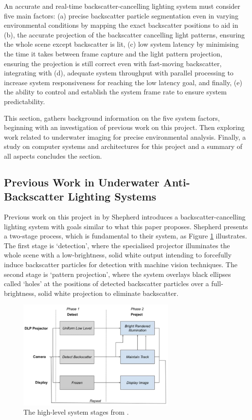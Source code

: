 An accurate and real-time backscatter-cancelling lighting system must consider five main factors: (a) precise backscatter particle segmentation even in varying environmental conditions by mapping the exact backscatter positions to aid in (b), the accurate projection of the backscatter cancelling light patterns, ensuring the whole scene except backscatter is lit, (c) low system latency by minimising the time it takes between frame capture and the light pattern projection, ensuring the projection is still correct even with fast-moving backscatter, integrating with (d), adequate system throughput with parallel processing to increase system responsiveness for reaching the low latency goal, and finally, (e) the ability to control and establish the system frame rate to ensure system predictability.

This section, gathers background information on the five system factors, beginning with an investigation of previous work on this project. Then exploring work related to underwater imaging for precise environmental analysis. Finally, a study on computer systems and architectures for this project and a summary of all aspects concludes the section.

\subsection{Previous Work in Underwater Anti-Backscatter Lighting Systems}
\label{prevwork}

Previous work on this project in \cite{katieshepherdMachineVisionBased2023} by Shepherd introduces a backscatter-cancelling lighting system with goals similar to what this paper proposes. Shepherd presents a two-stage process, which is fundamental to their system, as Figure \ref{fig:shepherd_system_stages} illustrates. The first stage is `detection', where the specialised projector illuminates the whole scene with a low-brightness, solid white output intending to forcefully induce backscatter particles for detection with machine vision techniques. The second stage is `pattern projection', where the system overlays black ellipses called `holes' at the positions of detected backscatter particles over a full-brightness, solid white projection to eliminate backscatter.

\begin{figure}[H]
    \centering
    \includegraphics[width=0.7\textwidth]{assets/shepherd_fig6_system.png}
    \caption{The high-level system stages from \cite{katieshepherdMachineVisionBased2023}.}
    \label{fig:shepherd_system_stages}
\end{figure}


